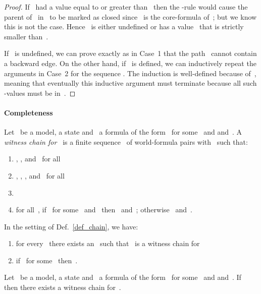 \documentclass{entcs}
\newcommand{\trea}{}
\begin{document}
\begin{center}
\begin{proof}
  If~ had a value equal to or greater than~
  then the \trea{}-rule would cause the parent of~ in~
  to be marked as closed
  since~ is the core-formula of~;
  but we know this is not the case.
  Hence~ is either undefined or
  has a value~ that is strictly smaller than~.

  If~ is undefined,
  we can prove exactly as in Case~1 that the path~ cannot contain a backward edge.
  On the other hand,
  if~ is defined,
  we can inductively repeat the arguments in Case~2
  for the sequence .
  The induction is well-defined because of~,
  meaning that eventually this inductive argument must terminate
  because all such -values must be in~.
\end{proof}

\paragraph{\bf Completeness}

\begin{definition}
  \label{def_chain}
  Let~ be a model,  a state
  and~ a formula of the form~
  for some~ and  and~.
  A \emph{witness chain for~}
  is a finite sequence~
  of world-formula pairs with~ such that:
  \begin{enumerate}
  \item , , and~ for all~
  \item , , ,
    and~ for all~
  \item 
  \item for all~,
    if~ for some~ and~
    then~ and~;
    otherwise~ and~.
  \end{enumerate}
\end{definition}
\begin{prop}
  \label{prop_lastelem}
  In the setting of Def.~\ref{def_chain}, we have:
  \begin{enumerate}
  \item for every~ there exists an~
    such that~
    is a witness chain for~
  \item if~ for some~ then~.
  \end{enumerate}
\end{prop}
\begin{proposition}
  \label{prop_chain}
  Let~ be a model,  a state
  and~ a formula of the form~
  for some~ and  and~.
  If~ then there exists a witness chain for~.
\end{proposition}


\end{center}
\end{document}
